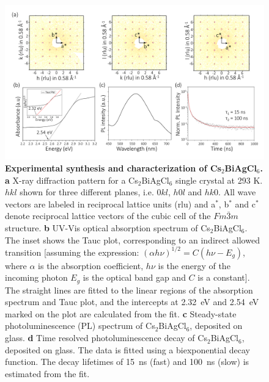 \documentclass[journal=jpcl,manuscript=letter,layout=traditional]{achemso}
\begin{document}
\begin{figure}[t!]
\begin{center}
\includegraphics[width=1.0\textwidth]{fig2.png}
\end{center}
\caption{\label{fig:2}
 \textbf{Experimental synthesis and characterization of Cs$_2$BiAgCl$_6$.}\\
 \textbf{a} X-ray diffraction pattern for a Cs$_2$BiAgCl$_6$ single crystal at 293 K. $hkl$ shown for three different planes,
 i.e.  $0kl$, $h0l$ and $hk0$. All wave vectors are labeled in reciprocal lattice units (rlu) and  a$^\mathrm{*}$, b$^\mathrm{*}$
 and c$^\mathrm{*}$ denote reciprocal lattice vectors of the cubic cell of the $Fm\bar{3}m$ structure.
 \textbf{b} UV-Vis optical absorption spectrum of Cs$_2$BiAgCl$_6$. The inset shows the Tauc plot, corresponding to an indirect
 allowed transition [assuming the expression: $(\alpha h\nu)^{1/2} = C(h\nu - E_g)$, where $\alpha$ is the absorption coefficient,
 $h\nu$ is the energy of the incoming photon $E_g$ is the optical band gap and $C$ is a constant]. The straight lines are fitted to the
 linear regions of the absorption spectrum and Tauc plot, and the intercepts at 2.32~eV and 2.54~eV marked on the plot are calculated from the fit.
 \textbf{c} Steady-state photoluminescence (PL) spectrum of Cs$_2$BiAgCl$_6$, deposited on glass.
 \textbf{d} Time resolved photoluminescence decay of Cs$_2$BiAgCl$_6$, deposited on glass. The data is fitted using a biexponential decay
 function. The decay lifetimes of 15~ns (fast) and 100~ns (slow) is estimated from the fit.
}
\end{figure}
\end{document}
